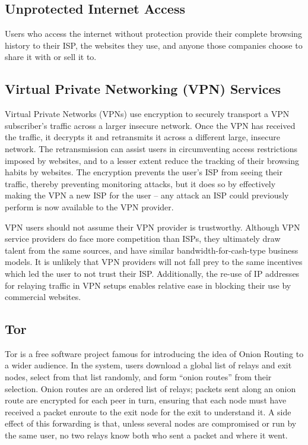 
\subsection{Unprotected Internet Access}

Users who access the internet without protection provide their
complete browsing history to their ISP, the websites they use, and
anyone those companies choose to share it with or sell it to.

\subsection{Virtual Private Networking (VPN) Services}

Virtual Private Networks (VPNs) use encryption to securely transport a
VPN subscriber's traffic across a larger insecure network. Once the
VPN has received the traffic, it decrypts it and retransmits it across
a different large, insecure network. The retransmission can assist
users in circumventing access restrictions imposed by websites, and to
a lesser extent reduce the tracking of their browsing habits by
websites. The encryption prevents the user's ISP from seeing their
traffic, thereby preventing monitoring attacks, but it does so by
effectively making the VPN a new ISP for the user -- any attack an ISP
could previously perform is now available to the VPN provider.

VPN users should not assume their VPN provider is
trustworthy. Although VPN service providers do face more competition
than ISPs, they ultimately draw talent from the same sources, and have
similar bandwidth-for-cash-type business models. It is unlikely that
VPN providers will not fall prey to the same incentives which led the
user to not trust their ISP. Additionally, the re-use of IP addresses
for relaying traffic in VPN setups enables relative ease in blocking
their use by commercial websites\cite{13}.

\subsection{Tor}

Tor\cite{TOR} is a free software project famous for introducing the
idea of Onion Routing to a wider audience. In the system, users
download a global list of relays and exit nodes, select from that list
randomly, and form ``onion routes'' from their selection. Onion routes
are an ordered list of relays; packets sent along an onion route are
encrypted for each peer in turn, ensuring that each node must have
received a packet enroute to the exit node for the exit to understand
it. A side effect of this forwarding is that, unless several nodes are
compromised or run by the same user, no two relays know both who sent
a packet and where it went.

